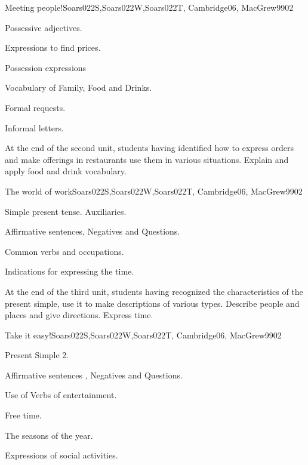 \begin{syllabus}
\begin{unit}{}{Meeting people!}{Soars022S,Soars022W,Soars022T, Cambridge06, MacGrew99}{0}{2}
   \begin{topics}
      \item Possessive adjectives.
      \item Expressions to find prices.
      \item Possession expressions
      \item Vocabulary of Family, Food and Drinks.
      \item Formal requests.
      \item Informal letters.
   \end{topics}

   \begin{learningoutcomes}
      \item At the end of the second unit, students having identified how to express orders and make offerings in restaurants use them in various situations. Explain and apply food and drink vocabulary.
   \end{learningoutcomes}

\end{unit}

\begin{unit}{}{The world of work}{Soars022S,Soars022W,Soars022T, Cambridge06, MacGrew99}{0}{2}
   \begin{topics}
      \item Simple present tense. Auxiliaries.
      \item Affirmative sentences, Negatives and Questions.
      \item Common verbs and occupations.
      \item Indications for expressing the time.
   \end{topics}

   \begin{learningoutcomes}
      \item At the end of the third unit, students having recognized the characteristics of the present simple, use it to make descriptions of various types. Describe people and places and give directions. Express time.
   \end{learningoutcomes}

\end{unit}

\begin{unit}{}{Take it easy!}{Soars022S,Soars022W,Soars022T, Cambridge06, MacGrew99}{0}{2}
   \begin{topics}
      \item Present Simple 2.
      \item Affirmative sentences , Negatives and Questions.
      \item Use of Verbs of entertainment.
      \item Free time.
      \item The seasons of the year.
      \item Expressions of social activities.
   \end{topics}


\end{unit}
\end{syllabus}
